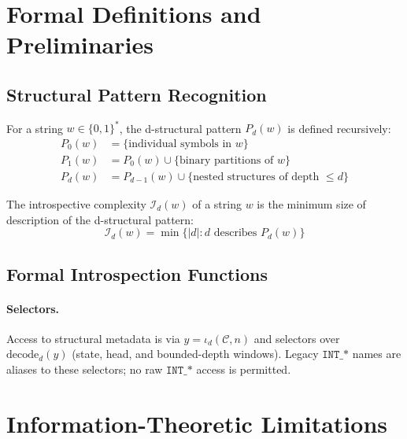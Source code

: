 
\section{Formal Definitions and Preliminaries}

\subsection{Structural Pattern Recognition}

\begin{definition}
For a string $w \in \{0,1\}^*$, the d-structural pattern $P_d(w)$ is defined recursively:
\begin{align*}
P_0(w) &= \{\text{individual symbols in } w\} \\
P_1(w) &= P_0(w) \cup \{\text{binary partitions of } w\} \\
P_d(w) &= P_{d-1}(w) \cup \{\text{nested structures of depth } \leq d\}
\end{align*}
\end{definition}

\begin{definition}
The introspective complexity $\mathcal{I}_d(w)$ of a string $w$ is the minimum size of description of the d-structural pattern:
$$\mathcal{I}_d(w) = \min\{|d| : d \text{ describes } P_d(w)\}$$
\end{definition}

\subsection{Formal Introspection Functions}

\paragraph{Selectors.} Access to structural metadata is via $y=\iota_d(\mathcal{C},n)$ and selectors over $\mathrm{decode}_d(y)$ (state, head, and bounded-depth windows). Legacy $\texttt{INT\_*}$ names are aliases to these selectors; no raw $\texttt{INT\_*}$ access is permitted.

\section{Information-Theoretic Limitations}

